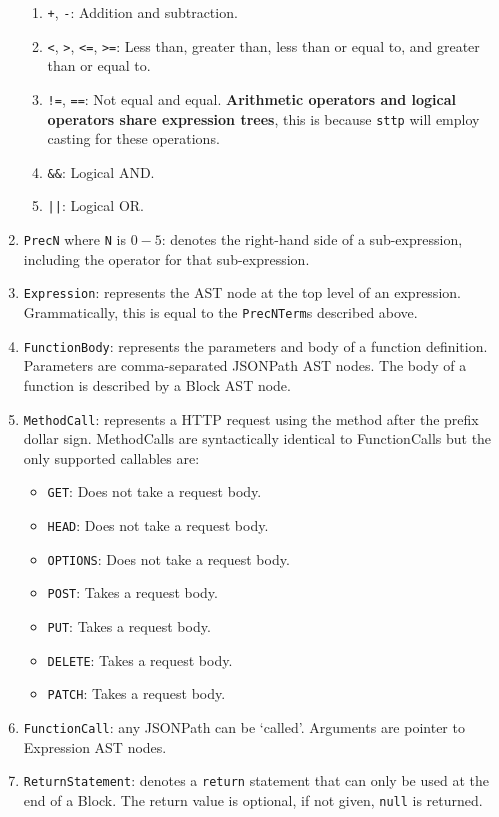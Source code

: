 \documentclass[]{full}
\theoremstyle{definition}
\begin{document}
\begin{enumerate}
\begin{enumerate}
        \item \verb|+|, \verb|-|: Addition and subtraction.
        \item \verb|<|, \verb|>|, \verb|<=|, \verb|>=|: Less than, greater than, less than or equal to, and greater than or equal to.
        \item \verb|!=|, \verb|==|: Not equal and equal. \textbf{Arithmetic operators and logical operators share expression trees}, this is because \verb|sttp| will employ casting for these operations.
        \item \verb|&&|: Logical AND.
        \item \verb+||+: Logical OR.
    \end{enumerate}
    \item \verb|PrecN| where \verb|N| is $0-5$: denotes the right-hand side of a sub-expression, including the operator for that sub-expression.
    \item \verb|Expression|: represents the AST node at the top level of an expression. Grammatically, this is equal to the \verb|PrecNTerm|s described above.
    \item \verb|FunctionBody|: represents the parameters and body of a function definition. Parameters are comma-separated JSONPath AST nodes. The body of a function is described by a Block AST node.
    \item \verb|MethodCall|: represents a HTTP request using the method after the prefix dollar sign. MethodCalls are syntactically identical to FunctionCalls but the only supported callables are:
    \begin{itemize}
        \item \verb|GET|: Does not take a request body.
        \item \verb|HEAD|: Does not take a request body.
        \item \verb|OPTIONS|: Does not take a request body.
        \item \verb|POST|: Takes a request body.
        \item \verb|PUT|: Takes a request body.
        \item \verb|DELETE|: Takes a request body.
        \item \verb|PATCH|: Takes a request body.
    \end{itemize}
    \item \verb|FunctionCall|: any JSONPath can be `called'. Arguments are pointer to Expression AST nodes.
    \item \verb|ReturnStatement|: denotes a \verb|return| statement that can only be used at the end of a Block. The return value is optional, if not given, \verb|null| is returned.

\end{enumerate}
\end{document}
